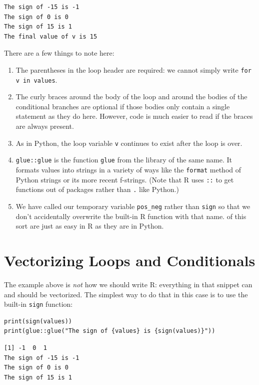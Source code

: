 \begin{lstlisting}
The sign of -15 is -1
The sign of 0 is 0
The sign of 15 is 1
The final value of v is 15
\end{lstlisting}

There are a few things to note here:

\begin{enumerate}
\item
  The parentheses in the loop header are required:
  we cannot simply write \texttt{for v in values}.
\item
  The curly braces around the body of the loop
  and around the bodies of the conditional branches are optional
  if those bodies only contain a single statement as they do here.
  However,
  code is much easier to read if the braces are always present.
\item
  As in Python,
  the loop variable \texttt{v} continues to exist after the loop is over.
\item
  \texttt{glue::glue} is the function \texttt{glue} from the library of the same name.
  It formats values into strings in a variety of ways
  like the \texttt{format} method of Python strings
  or its more recent f-strings.
  (Note that R uses \texttt{::} to get functions out of packages rather than \texttt{.} like Python.)
\item
  We have called our temporary variable \texttt{pos\_neg} rather than \texttt{sign}
  so that we don't accidentally overwrite the built-in R function with that name.
   of this sort
  are just as easy in R as they are in Python.
\end{enumerate}

\section{Vectorizing Loops and Conditionals}

The example above is \emph{not} how we should write R:
everything in that snippet can and should be vectorized.
The simplest way to do that in this case
is to use the built-in \texttt{sign} function:

\begin{lstlisting}
print(sign(values))
print(glue::glue("The sign of {values} is {sign(values)}"))
\end{lstlisting}

\begin{lstlisting}
[1] -1  0  1
The sign of -15 is -1
The sign of 0 is 0
The sign of 15 is 1
\end{lstlisting}

